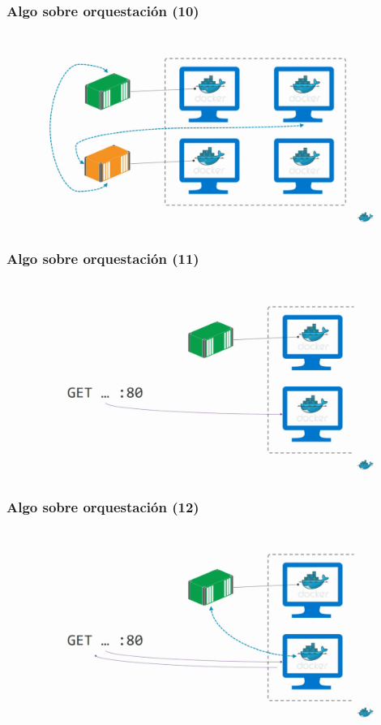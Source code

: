 \documentclass{beamer}
\begin{document}
\begin{frame}
  \frametitle{Algo sobre orquestación (10)}
	\begin{figure}[htp]
	\centering
	\includegraphics[width=0.95\linewidth]{img/orquestacion_10.png}
	\end{figure}
\end{frame}

\begin{frame}
  \frametitle{Algo sobre orquestación (11)}
	\begin{figure}[htp]
	\centering
	\includegraphics[width=0.95\linewidth]{img/orquestacion_11.png}
	\end{figure}
\end{frame}

\begin{frame}
  \frametitle{Algo sobre orquestación (12)}
	\begin{figure}[htp]
	\centering
	\includegraphics[width=0.95\linewidth]{img/orquestacion_12.png}
	\end{figure}
\end{frame}
\end{document}
